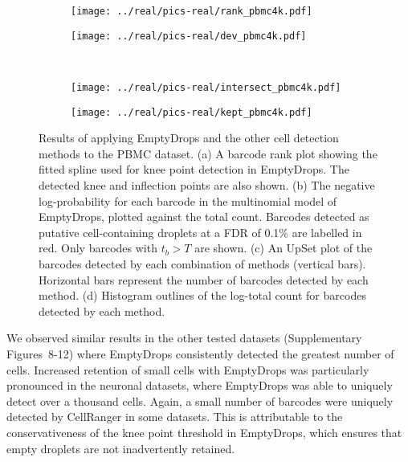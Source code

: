 \documentclass[10pt,letterpaper]{article}
\newcommand{\suppfigrealresults}{8-12}
\begin{document}
\begin{figure}[btp]
    \begin{center}
    \begin{subfigure}{0.49\textwidth}
        \texttt{[image: ../real/pics-real/rank\_pbmc4k.pdf]}
        \caption{}
    \end{subfigure}
    \begin{subfigure}{0.49\textwidth}
        \texttt{[image: ../real/pics-real/dev\_pbmc4k.pdf]}
        \caption{}
    \end{subfigure}\\[0.1in]
    \begin{subfigure}[b]{0.49\textwidth}
        \texttt{[image: ../real/pics-real/intersect\_pbmc4k.pdf]}
        \caption{}
    \end{subfigure}
    \begin{subfigure}[b]{0.49\textwidth}
        \texttt{[image: ../real/pics-real/kept\_pbmc4k.pdf]}
        \caption{}
    \end{subfigure}
\end{center}
    \caption{Results of applying EmptyDrops and the other cell detection methods to the PBMC dataset.
        (a) A barcode rank plot showing the fitted spline used for knee point detection in EmptyDrops. 
        The detected knee and inflection points are also shown.
        (b) The negative log-probability for each barcode in the multinomial model of EmptyDrops, plotted against the total count.
        Barcodes detected as putative cell-containing droplets at a FDR of 0.1\% are labelled in red.
        Only barcodes with $t_b > T$ are shown.
        (c) An UpSet plot \cite{lex2014upset} of the barcodes detected by each combination of methods (vertical bars).
        Horizontal bars represent the number of barcodes detected by each method.
        (d) Histogram outlines of the log-total count for barcodes detected by each method.
    }
\label{fig:realpbmc}
\end{figure}

We observed similar results in the other tested datasets (Supplementary Figures~\suppfigrealresults{}) where EmptyDrops consistently detected the greatest number of cells.
Increased retention of small cells with EmptyDrops was particularly pronounced in the neuronal datasets, where EmptyDrops was able to uniquely detect over a thousand cells.
Again, a small number of barcodes were uniquely detected by CellRanger in some datasets.
This is attributable to the conservativeness of the knee point threshold in EmptyDrops, which ensures that empty droplets are not inadvertently retained.
\end{document}
